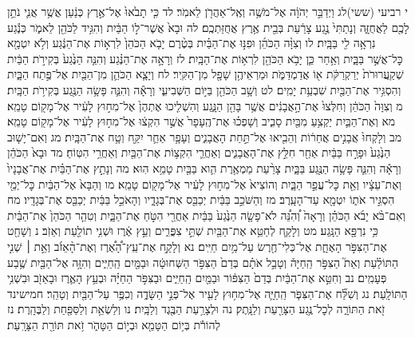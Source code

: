 \documentclass[twoside, openany, parskip=half, 11pt]{book}
\begin{document}
י רביעי (ששי)לג וַיְדַבֵּ֣ר יְהֹוָ֔ה אֶל־מֹשֶׁ֥ה וְאֶֽל־אַהֲרֹ֖ן לֵאמֹֽר׃ לד כִּ֤י תָבֹ֙אוּ֙ אֶל־אֶ֣רֶץ כְּנַ֔עַן אֲשֶׁ֥ר אֲנִ֛י נֹתֵ֥ן לָכֶ֖ם לַאֲחֻזָּ֑ה וְנָתַתִּי֙ נֶ֣גַע צָרַ֔עַת בְּבֵ֖ית אֶ֥רֶץ אֲחֻזַּתְכֶֽם׃ לה וּבָא֙ אֲשֶׁר־ל֣וֹ הַבַּ֔יִת וְהִגִּ֥יד לַכֹּהֵ֖ן לֵאמֹ֑ר כְּנֶ֕גַע נִרְאָ֥ה לִ֖י בַּבָּֽיִת׃ לו וְצִוָּ֨ה הַכֹּהֵ֜ן וּפִנּ֣וּ אֶת־הַבַּ֗יִת בְּטֶ֨רֶם יָבֹ֤א הַכֹּהֵן֙ לִרְא֣וֹת אֶת־הַנֶּ֔גַע וְלֹ֥א יִטְמָ֖א כׇּל־אֲשֶׁ֣ר בַּבָּ֑יִת וְאַ֥חַר כֵּ֛ן יָבֹ֥א הַכֹּהֵ֖ן לִרְא֥וֹת אֶת־הַבָּֽיִת׃ לז וְרָאָ֣ה אֶת־הַנֶּ֗גַע וְהִנֵּ֤ה הַנֶּ֙גַע֙ בְּקִירֹ֣ת הַבַּ֔יִת שְׁקַֽעֲרוּרֹת֙ יְרַקְרַקֹּ֔ת א֖וֹ אֲדַמְדַּמֹּ֑ת וּמַרְאֵיהֶ֥ן שָׁפָ֖ל מִן־הַקִּֽיר׃ לח וְיָצָ֧א הַכֹּהֵ֛ן מִן־הַבַּ֖יִת אֶל־פֶּ֣תַח הַבָּ֑יִת וְהִסְגִּ֥יר אֶת־הַבַּ֖יִת שִׁבְעַ֥ת יָמִֽים׃ לט וְשָׁ֥ב הַכֹּהֵ֖ן בַּיּ֣וֹם הַשְּׁבִיעִ֑י וְרָאָ֕ה וְהִנֵּ֛ה פָּשָׂ֥ה הַנֶּ֖גַע בְּקִירֹ֥ת הַבָּֽיִת׃ מ וְצִוָּה֙ הַכֹּהֵ֔ן וְחִלְּצוּ֙ אֶת־הָ֣אֲבָנִ֔ים אֲשֶׁ֥ר בָּהֵ֖ן הַנָּ֑גַע וְהִשְׁלִ֤יכוּ אֶתְהֶן֙ אֶל־מִח֣וּץ לָעִ֔יר אֶל־מָק֖וֹם טָמֵֽא׃ מא וְאֶת־הַבַּ֛יִת יַקְצִ֥עַ מִבַּ֖יִת סָבִ֑יב וְשָׁפְכ֗וּ אֶת־הֶֽעָפָר֙ אֲשֶׁ֣ר הִקְצ֔וּ אֶל־מִח֣וּץ לָעִ֔יר אֶל־מָק֖וֹם טָמֵֽא׃ מב וְלָקְחוּ֙ אֲבָנִ֣ים אֲחֵר֔וֹת וְהֵבִ֖יאוּ אֶל־תַּ֣חַת הָאֲבָנִ֑ים וְעָפָ֥ר אַחֵ֛ר יִקַּ֖ח וְטָ֥ח אֶת־הַבָּֽיִת׃ מג וְאִם־יָשׁ֤וּב הַנֶּ֙גַע֙ וּפָרַ֣ח בַּבַּ֔יִת אַחַ֖ר חִלֵּ֣ץ אֶת־הָאֲבָנִ֑ים וְאַחֲרֵ֛י הִקְצ֥וֹת אֶת־הַבַּ֖יִת וְאַחֲרֵ֥י הִטּֽוֹחַ׃ מד וּבָא֙ הַכֹּהֵ֔ן וְרָאָ֕ה וְהִנֵּ֛ה פָּשָׂ֥ה הַנֶּ֖גַע בַּבָּ֑יִת צָרַ֨עַת מַמְאֶ֥רֶת הִ֛וא בַּבַּ֖יִת טָמֵ֥א הֽוּא׃ מה וְנָתַ֣ץ אֶת־הַבַּ֗יִת אֶת־אֲבָנָיו֙ וְאֶת־עֵצָ֔יו וְאֵ֖ת כׇּל־עֲפַ֣ר הַבָּ֑יִת וְהוֹצִיא֙ אֶל־מִח֣וּץ לָעִ֔יר אֶל־מָק֖וֹם טָמֵֽא׃ מו וְהַבָּא֙ אֶל־הַבַּ֔יִת כׇּל־יְמֵ֖י הִסְגִּ֣יר אֹת֑וֹ יִטְמָ֖א עַד־הָעָֽרֶב׃ מז וְהַשֹּׁכֵ֣ב בַּבַּ֔יִת יְכַבֵּ֖ס אֶת־בְּגָדָ֑יו וְהָאֹכֵ֣ל בַּבַּ֔יִת יְכַבֵּ֖ס אֶת־בְּגָדָֽיו׃ מח וְאִם־בֹּ֨א יָבֹ֜א הַכֹּהֵ֗ן וְרָאָה֙ וְ֠הִנֵּ֠ה לֹא־פָשָׂ֤ה הַנֶּ֙גַע֙ בַּבַּ֔יִת אַחֲרֵ֖י הִטֹּ֣חַ אֶת־הַבָּ֑יִת וְטִהַ֤ר הַכֹּהֵן֙ אֶת־הַבַּ֔יִת כִּ֥י נִרְפָּ֖א הַנָּֽגַע׃ מט וְלָקַ֛ח לְחַטֵּ֥א אֶת־הַבַּ֖יִת שְׁתֵּ֣י צִפֳּרִ֑ים וְעֵ֣ץ אֶ֔רֶז וּשְׁנִ֥י תוֹלַ֖עַת וְאֵזֹֽב׃ נ וְשָׁחַ֖ט אֶת־הַצִּפֹּ֣ר הָאֶחָ֑ת אֶל־כְּלִי־חֶ֖רֶשׂ עַל־מַ֥יִם חַיִּֽים׃ נא וְלָקַ֣ח אֶת־עֵֽץ־הָ֠אֶ֠רֶז וְאֶת־הָ֨אֵזֹ֜ב וְאֵ֣ת ׀ שְׁנִ֣י הַתּוֹלַ֗עַת וְאֵת֮ הַצִּפֹּ֣ר הַֽחַיָּה֒ וְטָבַ֣ל אֹתָ֗ם בְּדַם֙ הַצִּפֹּ֣ר הַשְּׁחוּטָ֔ה וּבַמַּ֖יִם הַֽחַיִּ֑ים וְהִזָּ֥ה אֶל־הַבַּ֖יִת שֶׁ֥בַע פְּעָמִֽים׃ נב וְחִטֵּ֣א אֶת־הַבַּ֔יִת בְּדַם֙ הַצִּפּ֔וֹר וּבַמַּ֖יִם הַֽחַיִּ֑ים וּבַצִּפֹּ֣ר הַחַיָּ֗ה וּבְעֵ֥ץ הָאֶ֛רֶז וּבָאֵזֹ֖ב וּבִשְׁנִ֥י הַתּוֹלָֽעַת׃ נג וְשִׁלַּ֞ח אֶת־הַצִּפֹּ֧ר הַֽחַיָּ֛ה אֶל־מִח֥וּץ לָעִ֖יר אֶל־פְּנֵ֣י הַשָּׂדֶ֑ה וְכִפֶּ֥ר עַל־הַבַּ֖יִת וְטָהֵֽר׃ חמישינד זֹ֖את הַתּוֹרָ֑ה לְכׇל־נֶ֥גַע הַצָּרַ֖עַת וְלַנָּֽתֶק׃ נה וּלְצָרַ֥עַת הַבֶּ֖גֶד וְלַבָּֽיִת׃ נו וְלַשְׂאֵ֥ת וְלַסַּפַּ֖חַת וְלַבֶּהָֽרֶת׃ נז לְהוֹרֹ֕ת בְּי֥וֹם הַטָּמֵ֖א וּבְי֣וֹם הַטָּהֹ֑ר זֹ֥את תּוֹרַ֖ת הַצָּרָֽעַת׃
\end{document}
